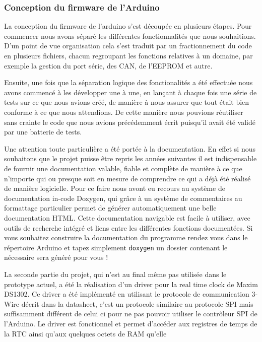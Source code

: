 		\subsubsection{Conception du firmware de l'Arduino}
		La conception du firmware de l'arduino s'est découpée en plusieurs étapes.
		Pour commencer nous avons séparé les différentes fonctionnalités que nous
		souhaitions. D'un point de vue organisation cela s'est traduit par un fractionnement
		du code en plusieurs fichiers, chacun regroupant les fonctions relatives à un
		domaine, par exemple la gestion du port série, des CAN, de l'EEPROM et autre.
		\par
		Ensuite, une fois que la séparation logique des fonctionalités a été effectuée
		nous avons commencé à les développer une à une, en lançant à chaque fois une
		série de tests sur ce que nous avions créé, de manière à nous assurer que tout
		était bien conforme à ce que nous attendions. De cette manière nous pouvions
		réutiliser sans crainte le code que nous avions précédemment écrit puisqu'il
		avait été validé par une batterie de tests.
		\par
		Une attention toute particulière a été portée à la documentation. En effet si nous
		souhaitons que le projet puisse être repris les années suivantes il
		est indispensable de fournir une documentation valable, fiable et complète
		de manière à ce que n'importe qui ou presque soit en mesure de comprendre
		ce qui a déjà été réalisé de manière logicielle. Pour ce faire nous avont eu
		recours au système de documentation in-code Doxygen, qui grâce à un
		système de commentaires au formattage particulier permet de générer automatiquement
		une belle documentation HTML. Cette documentation navigable est facile à utiliser, avec outils
		de recherche intégré et liens entre les différentes fonctions documentées.
		Si vous souhaitez construire la documentation du programme rendez vous dans
		le répertoire Arduino et tapez simplement \texttt{doxygen} un dossier contenant
		le nécessaire sera généré pour vous !
		\par
		La seconde partie du projet, qui n'est au final même pas utilisée dans le prototype
		actuel, a été la réalisation d'un driver pour la real time clock de Maxim DS1302.
		Ce driver a été implémenté en utilisant le protocole de communication 3-Wire décrit dans
		la datasheet, c'est un protocole similaire au protocole SPI mais suffisamment différent de celui ci
		pour ne pas pouvoir utiliser le contrôleur SPI de l'Arduino. Le driver est fonctionnel et
		permet d'accéder aux registres de temps de la RTC ainsi qu'aux quelques octets de RAM qu'elle

